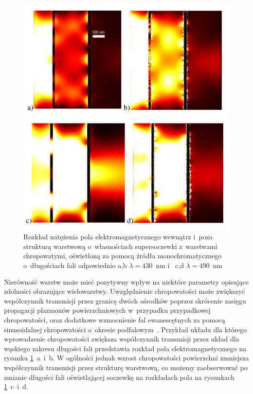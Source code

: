 \begin{figure}[!hbt]
	\begin{center}
	\includegraphics[width=.9\textwidth]{images/multilayer/plp-chropo.png}
	\end{center}
	\caption{Rozkład natężenia pola elektromagnetycznego wewnątrz i~poza strukturą warstwową o~własnościach supersoczewki z~warstwami chropowatymi, oświetloną za pomocą źródła monochromatycznego o~długościach fali odpowiednio a,b $\lambda=430$~nm  i~ c,d $\lambda=490$~nm~\cite{Stolarek_2013}}
	\label{fig:plp-chropo-fdtd}
\end{figure}


Nierówność warstw może mieć pozytywny wpływ na niektóre parametry opisujące zdolności obrazujące wielowarstwy. Uwzględnienie chropowatości może zwiększyć współczynnik transmisji przez granicę dwóch ośrodków poprzez skrócenie zasięgu propagacji plazmonów powierzchniowych w~przypadku przypadkowej chropowatości, oraz dodatkowe wzmocnienie fal ewanescętnych za pomocą sinusoidalnej chropowatości o~okresie podfalowym~\cite{huang2012subwavelength}. Przykład układu dla którego wprowadzenie chropowatości zwiększa współczynnik transmisji przez układ dla wąskiego zakresu długości fali przedstawia rozkład pola elektromagnetycznego na rysunku \ref{fig:plp-chropo-fdtd}~a~i~b. W ogólności jednak wzrost chropowatości powierzchni zmniejsza współczynnik transmisji przez strukturę warstwową, co możemy zaobserwować po zmianie długości fali oświetlającej soczewkę na rozkładach pola na rysunkach \ref{fig:plp-chropo-fdtd}~c~i~d. 

